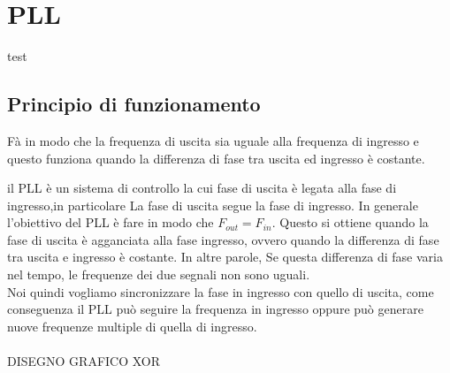 \section{PLL}
test
\subsection{Principio di funzionamento}
Fà in modo che la frequenza di uscita sia uguale alla frequenza di ingresso e questo funziona quando la differenza di fase tra uscita ed ingresso è costante.

{}%
{}%
%
il PLL è un sistema di controllo la cui fase di uscita è legata alla fase di ingresso,in particolare
La fase di uscita segue la fase di ingresso.
In generale l'obiettivo del PLL è fare in modo che $F_{out}=F_{in}$.
Questo si ottiene quando la fase di uscita è agganciata alla fase ingresso, ovvero quando 
la differenza di fase tra uscita e ingresso è costante.
In altre parole, Se questa differenza di fase varia nel tempo, le frequenze dei due segnali non sono uguali.\\
Noi quindi vogliamo sincronizzare la fase in ingresso con quello di uscita, come conseguenza il PLL può seguire
 la frequenza in ingresso oppure può generare nuove frequenze multiple di quella di ingresso.\\
\\
DISEGNO GRAFICO XOR\\
\\


